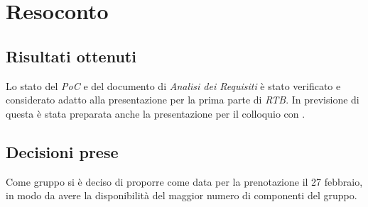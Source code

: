 \section{Resoconto}

\subsection{Risultati ottenuti}
Lo stato del \textit{PoC} e del documento di \textit{Analisi dei Requisiti} è stato verificato e considerato adatto alla presentazione per la prima parte di \textit{RTB}. In previsione di questa è stata preparata anche la presentazione per il colloquio con \Cardin.

\subsection{Decisioni prese}
Come gruppo si è deciso di proporre come data per la prenotazione il 27 febbraio, in modo da avere la disponibilità del maggior numero di componenti del gruppo.